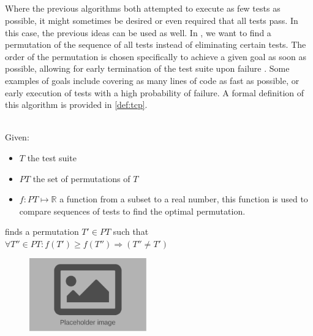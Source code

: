 
\subsection{\tcp{}}
Where the previous algorithms both attempted to execute as few tests as possible, it might sometimes be desired or even required that all tests pass. In this case, the previous ideas can be used as well. In \tcp{}, we want to find a permutation of the sequence of all tests instead of eliminating certain tests. The order of the permutation is chosen specifically to achieve a given goal as soon as possible, allowing for early termination of the test suite upon failure \cite{10.1002/stv.430}. Some examples of goals include covering as many lines of code as fast as possible, or early execution of tests with a high probability of failure. A formal definition of this algorithm is provided in \autoref{def:tcp}.

\begin{definition}[\tcp{}]
\label{def:tcp}
\mbox{}\\Given:
\begin{itemize}
	\item $T$ the test suite
	\item $PT$ the set of permutations of $T$
	\item $f: PT \mapsto \mathbb{R}$ a function from a subset to a real number, this function is used to compare sequences of tests to find the optimal permutation.
\end{itemize}

\noindent \tcp{} finds a permutation $T' \in PT$ such that $\forall T'' \in PT : f(T') \ge f(T'') \Rightarrow (T'' \ne T')$ 
\end{definition}

\begin{figure}[htbp!]
	\centering
	\includegraphics[width=0.45\textwidth]{assets/placeholder.pdf}
	\caption{\tcp{}}
	\label{fig:tcp}
\end{figure}
